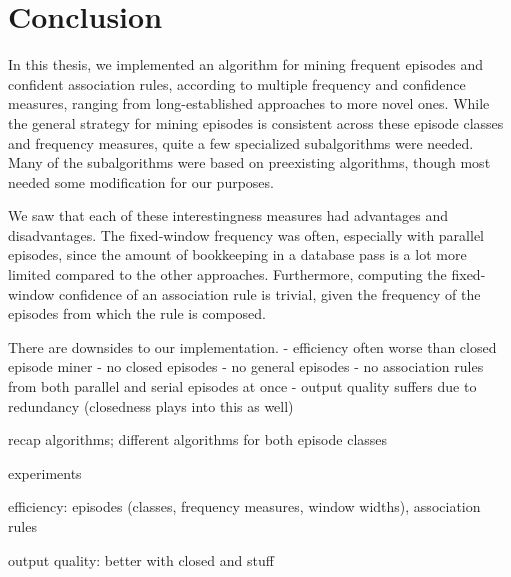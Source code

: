 \chapter{Conclusion}

In this thesis, we implemented an algorithm for mining frequent episodes and confident association rules, according to multiple frequency and confidence measures, ranging from long-established approaches to more novel ones. While the general strategy for mining episodes is consistent across these episode classes and frequency measures, quite a few specialized subalgorithms were needed. Many of the subalgorithms were based on preexisting algorithms, though most needed some modification for our purposes.


We saw that each of these interestingness measures had advantages and disadvantages. The fixed-window frequency was often, especially with parallel episodes, since the amount of bookkeeping in a database pass is a lot more limited compared to the other approaches. Furthermore, computing the fixed-window confidence of an association rule is trivial, given the frequency of the episodes from which the rule is composed.


There are downsides to our implementation.
- efficiency often worse than closed episode miner
- no closed episodes
- no general episodes
- no association rules from both parallel and serial episodes at once
- output quality suffers due to redundancy (closedness plays into this as well)

recap algorithms; different algorithms for both episode classes

experiments

efficiency: episodes (classes, frequency measures, window widths), association rules

output quality: better with closed and stuff
